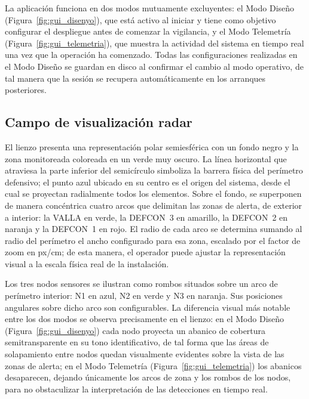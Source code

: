 La aplicación funciona en dos modos mutuamente excluyentes: el Modo Diseño (Figura~\ref{fig:gui_disenyo}), que está activo al iniciar y tiene como objetivo configurar el despliegue antes de comenzar la vigilancia, y el Modo Telemetría (Figura~\ref{fig:gui_telemetria}), que muestra la actividad del sistema en tiempo real una vez que la operación ha comenzado. Todas las configuraciones realizadas en el Modo Diseño se guardan en disco al confirmar el cambio al modo operativo, de tal manera que la sesión se recupera automáticamente en los arranques posteriores.



\subsection{Campo de visualización radar}

El lienzo presenta una representación polar semiesférica con un fondo negro y la zona monitoreada coloreada en un verde muy oscuro. La línea horizontal que atraviesa la parte inferior del semicírculo simboliza la barrera física del perímetro defensivo; el punto azul ubicado en su centro es el origen del sistema, desde el cual se proyectan radialmente todos los elementos. Sobre el fondo, se superponen de manera concéntrica cuatro arcos que delimitan las zonas de alerta, de exterior a interior: la VALLA en verde, la DEFCON~3 en amarillo, la DEFCON~2 en naranja y la DEFCON~1 en rojo. El radio de cada arco se determina sumando al radio del perímetro el ancho configurado para esa zona, escalado por el factor de zoom en px/cm; de esta manera, el operador puede ajustar la representación visual a la escala física real de la instalación.

Los tres nodos sensores se ilustran como rombos situados sobre un arco de perímetro interior: N1 en azul, N2 en verde y N3 en naranja. Sus posiciones angulares sobre dicho arco son configurables. La diferencia visual más notable entre los dos modos se observa precisamente en el lienzo: en el Modo Diseño (Figura~\ref{fig:gui_disenyo}) cada nodo proyecta un abanico de cobertura semitransparente en su tono identificativo, de tal forma que las áreas de solapamiento entre nodos quedan visualmente evidentes sobre la vista de las zonas de alerta; en el Modo Telemetría (Figura~\ref{fig:gui_telemetria}) los abanicos desaparecen, dejando únicamente los arcos de zona y los rombos de los nodos, para no obstaculizar la interpretación de las detecciones en tiempo real.

